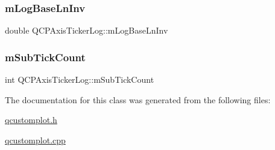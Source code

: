 \subsubsection{\texorpdfstring{m\+Log\+Base\+Ln\+Inv}{mLogBaseLnInv}}
{\footnotesize\ttfamily double Q\+C\+P\+Axis\+Ticker\+Log\+::m\+Log\+Base\+Ln\+Inv\hspace{0.3cm}{\ttfamily [protected]}}

\mbox{\label{class_q_c_p_axis_ticker_log_a3d92b729bedbbbd34ee5f74565defd95}} 
\subsubsection{\texorpdfstring{m\+Sub\+Tick\+Count}{mSubTickCount}}
{\footnotesize\ttfamily int Q\+C\+P\+Axis\+Ticker\+Log\+::m\+Sub\+Tick\+Count\hspace{0.3cm}{\ttfamily [protected]}}



The documentation for this class was generated from the following files\+:\begin{DoxyCompactItemize}
\item 
\hyperlink{qcustomplot_8h}{qcustomplot.\+h}\item 
\hyperlink{qcustomplot_8cpp}{qcustomplot.\+cpp}\end{DoxyCompactItemize}
